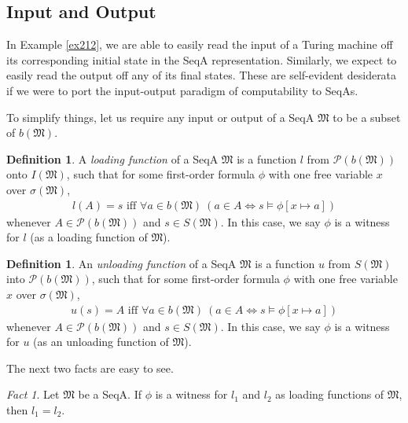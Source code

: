 \documentclass[12pt, twoside]{memoir}
\numberwithin{equation}{section}
\theoremstyle{definition}
\newtheorem{defi}[thm]{Definition}
\theoremstyle{remark}
\newtheorem{fact}[thm]{Fact}
\theoremstyle{definition}
\theoremstyle{definition}
\theoremstyle{definition}
\theoremstyle{remark}
\begin{document}
\subsection{Input and Output}\label{ss250}

In Example \ref{ex212}, we are able to easily read the input of a Turing machine off its corresponding initial state in the SeqA representation. Similarly, we expect to easily read the output off any of its final states. These are self-evident desiderata if we were to port the input-output paradigm of computability to SeqAs. 

To simplify things, let us require any input or output of a SeqA $\mathfrak{M}$ to be a subset of $b(\mathfrak{M})$.

\begin{defi}
A \emph{loading function} of a SeqA $\mathfrak{M}$ is a function $l$ from $\mathcal{P}(b(\mathfrak{M}))$ onto $I(\mathfrak{M})$, such that for some first-order formula $\phi$ with one free variable $x$ over $\sigma(\mathfrak{M})$,
\begin{align*}
    l(A) = s \text{ iff } \forall a \in b(\mathfrak{M}) \ (a \in A \iff s \models \phi[x \mapsto a])
\end{align*}
whenever $A \in \mathcal{P}(b(\mathfrak{M}))$ and $s \in S(\mathfrak{M})$. In this case, we say $\phi$ is a witness for $l$ (as a loading function of $\mathfrak{M}$).
\end{defi}

\begin{defi}
An \emph{unloading function} of a SeqA $\mathfrak{M}$ is a function $u$ from $S(\mathfrak{M})$ into $\mathcal{P}(b(\mathfrak{M}))$, such that for some first-order formula $\phi$ with one free variable $x$ over $\sigma(\mathfrak{M})$,
\begin{align*}
    u(s) = A \text{ iff } \forall a \in b(\mathfrak{M}) \ (a \in A \iff s \models \phi[x \mapsto a])
\end{align*}
whenever $A \in \mathcal{P}(b(\mathfrak{M}))$ and $s \in S(\mathfrak{M})$. In this case, we say $\phi$ is a witness for $u$ (as an unloading function of $\mathfrak{M}$).
\end{defi}

The next two facts are easy to see.

\begin{fact}\label{fact215}
Let $\mathfrak{M}$ be a SeqA. If $\phi$ is a witness for $l_1$ and $l_2$ as loading functions of $\mathfrak{M}$, then $l_1 = l_2$.
\end{fact}
\end{document}
